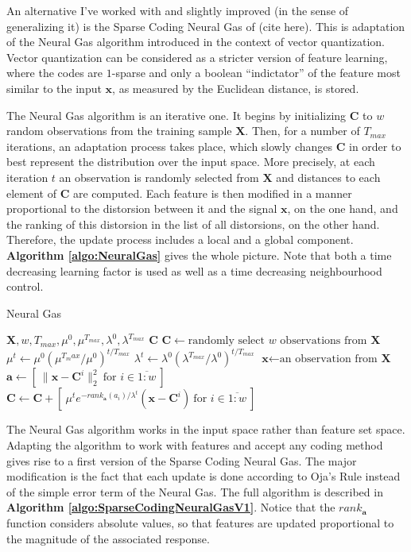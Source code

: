 \documentclass[12pt,a4paper,oneside,english]{UPBThesis}
\newcommand{\hcrange}[2]{\overline{{#1}\colon\!\!{#2}}}
\begin{document}
An alternative I've worked with and slightly improved (in the sense of generalizing it) is the Sparse Coding Neural Gas of (cite here). This is adaptation of the Neural Gas algorithm introduced in the context of vector quantization. Vector quantization can be considered as a stricter version of feature learning, where the codes are $1$-sparse and only a boolean ``indictator'' of the feature most similar to the input $\textbf{x}$, as measured by the Euclidean distance, is stored.

The Neural Gas algorithm is an iterative one. It begins by initializing $\textbf{C}$ to $w$ random observations from the training sample $\textbf{X}$. Then, for a number of $T_{max}$ iterations, an adaptation process takes place, which slowly changes $\textbf{C}$ in order to best represent the distribution over the input space. More precisely, at each iteration $t$ an observation is randomly selected from $\textbf{X}$ and distances to each element of $\textbf{C}$ are computed. Each feature is then modified in a manner proportional to the distorsion between it and the signal $\textbf{x}$, on the one hand, and the ranking of this distorsion in the list of all distorsions, on the other hand. Therefore, the update process includes a local and a global component. \textbf{Algorithm \ref{algo:NeuralGas}} gives the whole picture. Note that both a time decreasing learning factor is used as well as a time decreasing neighbourhood control. 

\begin{algorithm}
\caption{Neural Gas}
\label{algo:NeuralGas}
\begin{algorithmic}
\Require $\textbf{X},w,T_{max},\mu^0,\mu^{T_{max}},\lambda^0,\lambda^{T_{max}}$
\Ensure $\textbf{C}$
\State $\textbf{C} \gets \mbox{randomly select $w$ observations from $\textbf{X}$}$
\For {$t = \hcrange{1}{T_{max}}$}
\State $\mu^t \gets \mu^0 (\mu^{T_max} / \mu^0)^{t / T_{max}}$ 
\State $\lambda^t \gets \lambda^0 (\lambda^{T_{max}} / \lambda^0)^{t / T_{max}}$ 
\State $\textbf{x} \gets \text{an observation from $\textbf{X}$}$
\State $\textbf{a} \gets [ ~ \|\textbf{x} - \textbf{C}^i\|_2^2 ~ \mbox{for $i \in \hcrange{1}{w}$} ~ ]$
\State $\textbf{C} \gets \textbf{C} + [ ~ \mu^t e^{-rank_{\textbf{a}}(a_i) / \lambda^t} (\textbf{x} - \textbf{C}^i) ~ \mbox{for $i \in \hcrange{1}{w}$} ~ ]$
\EndFor
\end{algorithmic}
\end{algorithm}

The Neural Gas algorithm works in the input space rather than feature set space. Adapting the algorithm to work with features and accept any coding method gives rise to a first version of the Sparse Coding Neural Gas. The major modification is the fact that each update is done according to Oja's Rule \cite{oja-rule} instead of the simple error term of the Neural Gas. The full algorithm is described in \textbf{Algorithm \ref{algo:SparseCodingNeuralGasV1}}. Notice that the $rank_{\textbf{a}}$ function considers absolute values, so that features are updated proportional to the magnitude of the associated response.
\end{document}
